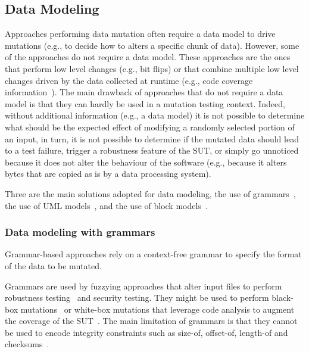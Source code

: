 
\subsection{Data Modeling}
\label{sec:dataModeling}

Approaches performing data mutation often require a data model to drive mutations (e.g., to decide how to alters a specific chunk of data). 
However, some of the approaches do not require a data model. 
These approaches are the ones that perform low level changes (e.g., bit flips) or that combine multiple low level changes driven by the data collected at runtime (e.g., code coverage information~\cite{}).
The main drawback of approaches that do not require a data model is that they can hardly be used in a mutation testing context.
Indeed, without additional information (e.g., a data model) it is not possible to determine what should be the expected effect of modifying a randomly selected portion of an input, in turn, it is not possible to determine if the mutated data should lead to a test failure, trigger a robustness feature of the SUT, or simply go unnoticed because it does not alter the behaviour of the software (e.g., because it alters bytes that are copied as is by a data processing system).

Three are the main solutions adopted for data modeling, the use of grammars~\cite{ghosh1998testing,Godefroid:GrammarBasedFuzzying:2008,godefroid2012sage,bounimova2013billions}, the use of UML models~\cite{di2015evolutionary}, and the use of block models~\cite{pham2016model,PeachFuzzer}.

\subsubsection{Data modeling with grammars}

Grammar-based approaches rely on a context-free grammar to specify the format of the data to be mutated. 

Grammars are used by fuzzying approaches that alter input files to perform robustness testing~\cite{ghosh1998testing} and security testing. They might be used to perform black-box mutations~\cite{ghosh1998testing} or white-box mutations that leverage code analysis to augment the coverage of the SUT~\cite{Godefroid:GrammarBasedFuzzying:2008}.
The main limitation of grammars is that they cannot be used to encode integrity constraints such as size-of, offset-of, length-of and checksums~\cite{pham2016model}. 

